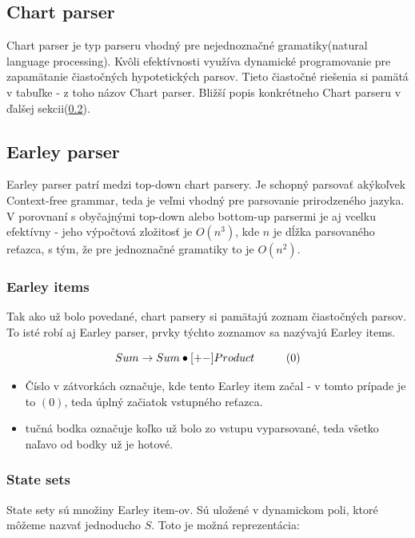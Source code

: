 \documentclass[12pt,a4paper]{report}
\theoremstyle{definition}
\theoremstyle{remark}
\newcommand\tab[1][1cm]{\hspace*{#1}}
\begin{document}
\subsection{Chart parser} 
Chart parser je typ parseru vhodný pre nejednoznačné gramatiky(natural language processing). Kvôli efektívnosti využíva dynamické programovanie pre zapamätanie čiastočných hypotetických parsov. Tieto čiastočné riešenia si pamätá v tabuľke - z toho názov Chart parser. Bližší popis konkrétneho Chart parseru v ďalšej sekcii(\ref{sec:earley}).

\subsection{Earley parser}
\label{sec:earley}

Earley parser\cite{Vaillant} patrí medzi top-down chart parsery. Je schopný parsovať akýkoľvek Context-free grammar, teda je veľmi vhodný pre parsovanie prirodzeného jazyka. V porovnaní s obyčajnými top-down alebo bottom-up parsermi je aj vcelku efektívny - jeho výpočtová zložitosť je $O(n^3)$, kde $n$ je dĺžka parsovaného reťazca, s tým, že pre jednoznačné gramatiky to je $O(n^2)$.

\subsubsection*{Earley items} 
Tak ako už bolo povedané, chart parsery si pamätajú zoznam čiastočných parsov. To isté robí aj Earley parser, prvky týchto zoznamov sa nazývajú Earley items.

$$ Sum \to Sum \bullet [+-] Product \tab  (0)  $$

\begin{itemize}
\item Číslo v zátvorkách označuje, kde tento Earley item začal - v tomto prípade je to $(0)$, teda úplný začiatok vstupného reťazca.
\item tučná bodka označuje koľko už bolo zo vstupu vyparsované, teda všetko naľavo od bodky už je hotové. 
\end{itemize}

\subsubsection*{State sets}

State sety sú množiny Earley item-ov. Sú uložené v dynamickom poli, ktoré môžeme nazvať jednoducho $S$. Toto je možná reprezentácia:
\end{document}
